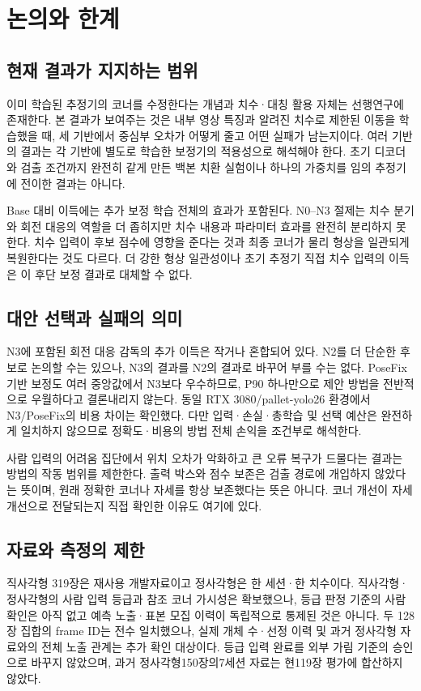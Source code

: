 \section{논의와 한계}\label{sec:discussion}
\subsection{현재 결과가 지지하는 범위}
이미 학습된 추정기의 코너를 수정한다는 개념과 치수·대칭 활용 자체는 선행연구에 존재한다. 본 결과가 보여주는 것은 내부 영상 특징과 알려진 치수로 제한된 이동을 학습했을 때, 세 기반에서 중심부 오차가 어떻게 줄고 어떤 실패가 남는지이다. 여러 기반의 결과는 각 기반에 별도로 학습한 보정기의 적용성으로 해석해야 한다. 초기 디코더와 검출 조건까지 완전히 같게 만든 백본 치환 실험이나 하나의 가중치를 임의 추정기에 전이한 결과는 아니다.

Base 대비 이득에는 추가 보정 학습 전체의 효과가 포함된다. N0--N3 절제는 치수 분기와 회전 대응의 역할을 더 좁히지만 치수 내용과 파라미터 효과를 완전히 분리하지 못한다. 치수 입력이 후보 점수에 영향을 준다는 것과 최종 코너가 물리 형상을 일관되게 복원한다는 것도 다르다. 더 강한 형상 일관성이나 초기 추정기 직접 치수 입력의 이득은 이 후단 보정 결과로 대체할 수 없다.

\subsection{대안 선택과 실패의 의미}
N3에 포함된 회전 대응 감독의 추가 이득은 작거나 혼합되어 있다. N2를 더 단순한 후보로 논의할 수는 있으나, N3의 결과를 N2의 결과로 바꾸어 부를 수는 없다. PoseFix 기반 보정도 여러 중앙값에서 N3보다 우수하므로, P90 하나만으로 제안 방법을 전반적으로 우월하다고 결론내리지 않는다. 동일 RTX 3080/pallet-yolo26 환경에서 N3/PoseFix의 비용 차이는 확인했다. 다만 입력·손실·총학습 및 선택 예산은 완전하게 일치하지 않으므로 정확도·비용의 방법 전체 손익을 조건부로 해석한다.

사람 입력의 어려움 집단에서 위치 오차가 악화하고 큰 오류 복구가 드물다는 결과는 방법의 작동 범위를 제한한다. 출력 박스와 점수 보존은 검출 경로에 개입하지 않았다는 뜻이며, 원래 정확한 코너나 자세를 항상 보존했다는 뜻은 아니다. 코너 개선이 자세 개선으로 전달되는지 직접 확인한 이유도 여기에 있다.

\subsection{자료와 측정의 제한}
직사각형 319장은 재사용 개발자료이고 정사각형은 한 세션·한 치수이다. 직사각형·정사각형의 사람 입력 등급과 참조 코너 가시성은 확보했으나, 등급 판정 기준의 사람 확인은 아직 없고 예측 노출·표본 모집 이력이 독립적으로 통제된 것은 아니다. 두 128장 집합의 frame ID는 전수 일치했으나, 실제 개체 수·선정 이력 및 과거 정사각형 자료와의 전체 노출 관계는 추가 확인 대상이다. 등급 입력 완료를 외부 가림 기준의 승인으로 바꾸지 않았으며, 과거 정사각형150장의7세션 자료는 현119장 평가에 합산하지 않았다.

